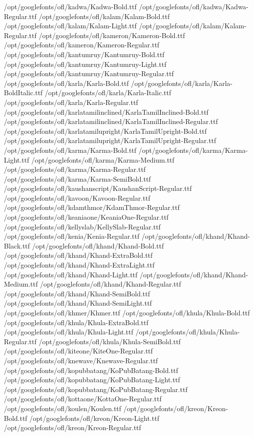 /opt/googlefonts/ofl/kadwa/Kadwa-Bold.ttf
/opt/googlefonts/ofl/kadwa/Kadwa-Regular.ttf
/opt/googlefonts/ofl/kalam/Kalam-Bold.ttf
/opt/googlefonts/ofl/kalam/Kalam-Light.ttf
/opt/googlefonts/ofl/kalam/Kalam-Regular.ttf
/opt/googlefonts/ofl/kameron/Kameron-Bold.ttf
/opt/googlefonts/ofl/kameron/Kameron-Regular.ttf
/opt/googlefonts/ofl/kantumruy/Kantumruy-Bold.ttf
/opt/googlefonts/ofl/kantumruy/Kantumruy-Light.ttf
/opt/googlefonts/ofl/kantumruy/Kantumruy-Regular.ttf
/opt/googlefonts/ofl/karla/Karla-Bold.ttf
/opt/googlefonts/ofl/karla/Karla-BoldItalic.ttf
/opt/googlefonts/ofl/karla/Karla-Italic.ttf
/opt/googlefonts/ofl/karla/Karla-Regular.ttf
/opt/googlefonts/ofl/karlatamilinclined/KarlaTamilInclined-Bold.ttf
/opt/googlefonts/ofl/karlatamilinclined/KarlaTamilInclined-Regular.ttf
/opt/googlefonts/ofl/karlatamilupright/KarlaTamilUpright-Bold.ttf
/opt/googlefonts/ofl/karlatamilupright/KarlaTamilUpright-Regular.ttf
/opt/googlefonts/ofl/karma/Karma-Bold.ttf
/opt/googlefonts/ofl/karma/Karma-Light.ttf
/opt/googlefonts/ofl/karma/Karma-Medium.ttf
/opt/googlefonts/ofl/karma/Karma-Regular.ttf
/opt/googlefonts/ofl/karma/Karma-SemiBold.ttf
/opt/googlefonts/ofl/kaushanscript/KaushanScript-Regular.ttf
/opt/googlefonts/ofl/kavoon/Kavoon-Regular.ttf
/opt/googlefonts/ofl/kdamthmor/KdamThmor-Regular.ttf
/opt/googlefonts/ofl/keaniaone/KeaniaOne-Regular.ttf
/opt/googlefonts/ofl/kellyslab/KellySlab-Regular.ttf
/opt/googlefonts/ofl/kenia/Kenia-Regular.ttf
/opt/googlefonts/ofl/khand/Khand-Black.ttf
/opt/googlefonts/ofl/khand/Khand-Bold.ttf
/opt/googlefonts/ofl/khand/Khand-ExtraBold.ttf
/opt/googlefonts/ofl/khand/Khand-ExtraLight.ttf
/opt/googlefonts/ofl/khand/Khand-Light.ttf
/opt/googlefonts/ofl/khand/Khand-Medium.ttf
/opt/googlefonts/ofl/khand/Khand-Regular.ttf
/opt/googlefonts/ofl/khand/Khand-SemiBold.ttf
/opt/googlefonts/ofl/khand/Khand-SemiLight.ttf
/opt/googlefonts/ofl/khmer/Khmer.ttf
/opt/googlefonts/ofl/khula/Khula-Bold.ttf
/opt/googlefonts/ofl/khula/Khula-ExtraBold.ttf
/opt/googlefonts/ofl/khula/Khula-Light.ttf
/opt/googlefonts/ofl/khula/Khula-Regular.ttf
/opt/googlefonts/ofl/khula/Khula-SemiBold.ttf
/opt/googlefonts/ofl/kiteone/KiteOne-Regular.ttf
/opt/googlefonts/ofl/knewave/Knewave-Regular.ttf
/opt/googlefonts/ofl/kopubbatang/KoPubBatang-Bold.ttf
/opt/googlefonts/ofl/kopubbatang/KoPubBatang-Light.ttf
/opt/googlefonts/ofl/kopubbatang/KoPubBatang-Regular.ttf
/opt/googlefonts/ofl/kottaone/KottaOne-Regular.ttf
/opt/googlefonts/ofl/koulen/Koulen.ttf
/opt/googlefonts/ofl/kreon/Kreon-Bold.ttf
/opt/googlefonts/ofl/kreon/Kreon-Light.ttf
/opt/googlefonts/ofl/kreon/Kreon-Regular.ttf
